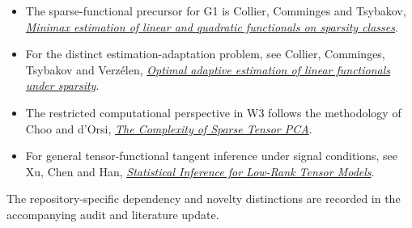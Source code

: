 \begin{itemize}
\tightlist
\item
  The sparse-functional precursor for G1 is Collier, Comminges and
  Tsybakov, \href{https://arxiv.org/abs/1502.00665}{\emph{Minimax
  estimation of linear and quadratic functionals on sparsity classes}}.
\item
  For the distinct estimation-adaptation problem, see Collier,
  Comminges, Tsybakov and Verzélen,
  \href{https://arxiv.org/abs/1611.09744}{\emph{Optimal adaptive
  estimation of linear functionals under sparsity}}.
\item
  The restricted computational perspective in W3 follows the methodology
  of Choo and d'Orsi, \href{https://arxiv.org/abs/2106.06308}{\emph{The
  Complexity of Sparse Tensor PCA}}.
\item
  For general tensor-functional tangent inference under signal
  conditions, see Xu, Chen and Han,
  \href{https://arxiv.org/abs/2501.16223}{\emph{Statistical Inference
  for Low-Rank Tensor Models}}.
\end{itemize}

The repository-specific dependency and novelty distinctions are recorded
in the accompanying audit and literature update.
